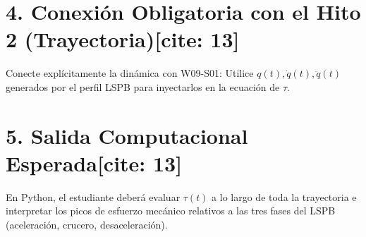 \documentclass[11pt, a4paper]{article}
\begin{document}
\section*{4. Conexión Obligatoria con el Hito 2 (Trayectoria)[cite: 13]}
Conecte explícitamente la dinámica con W09-S01: Utilice $q(t), \dot{q}(t), \ddot{q}(t)$ generados por el perfil LSPB para inyectarlos en la ecuación de $\tau$.

\section*{5. Salida Computacional Esperada[cite: 13]}
En Python, el estudiante deberá evaluar $\tau(t)$ a lo largo de toda la trayectoria e interpretar los picos de esfuerzo mecánico relativos a las tres fases del LSPB (aceleración, crucero, desaceleración).
\end{document}
